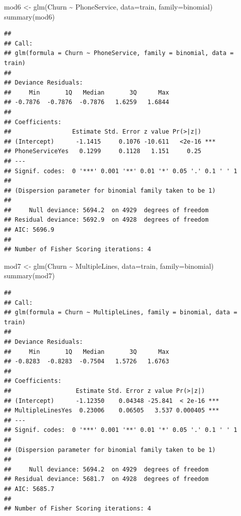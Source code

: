 \documentclass[
  twoside]{article}
\newenvironment{Shaded}{\begin{snugshade}}{\end{snugshade}}
\newcommand{\AttributeTok}[1]{\textcolor[rgb]{0.77,0.63,0.00}{#1}}
\newcommand{\FunctionTok}[1]{\textcolor[rgb]{0.00,0.00,0.00}{#1}}
\newcommand{\NormalTok}[1]{#1}
\newcommand{\OtherTok}[1]{\textcolor[rgb]{0.56,0.35,0.01}{#1}}
\newcommand{\SpecialCharTok}[1]{\textcolor[rgb]{0.00,0.00,0.00}{#1}}
\begin{document}
\begin{Shaded}
\begin{Highlighting}[]
\NormalTok{mod6 }\OtherTok{\textless{}{-}} \FunctionTok{glm}\NormalTok{(Churn }\SpecialCharTok{\textasciitilde{}}\NormalTok{ PhoneService, }\AttributeTok{data=}\NormalTok{train, }\AttributeTok{family=}\NormalTok{binomial)}
\FunctionTok{summary}\NormalTok{(mod6)}
\end{Highlighting}
\end{Shaded}

\begin{verbatim}
## 
## Call:
## glm(formula = Churn ~ PhoneService, family = binomial, data = train)
## 
## Deviance Residuals: 
##     Min       1Q   Median       3Q      Max  
## -0.7876  -0.7876  -0.7876   1.6259   1.6844  
## 
## Coefficients:
##                 Estimate Std. Error z value Pr(>|z|)    
## (Intercept)      -1.1415     0.1076 -10.611   <2e-16 ***
## PhoneServiceYes   0.1299     0.1128   1.151     0.25    
## ---
## Signif. codes:  0 '***' 0.001 '**' 0.01 '*' 0.05 '.' 0.1 ' ' 1
## 
## (Dispersion parameter for binomial family taken to be 1)
## 
##     Null deviance: 5694.2  on 4929  degrees of freedom
## Residual deviance: 5692.9  on 4928  degrees of freedom
## AIC: 5696.9
## 
## Number of Fisher Scoring iterations: 4
\end{verbatim}

\begin{Shaded}
\begin{Highlighting}[]
\NormalTok{mod7 }\OtherTok{\textless{}{-}} \FunctionTok{glm}\NormalTok{(Churn }\SpecialCharTok{\textasciitilde{}}\NormalTok{ MultipleLines, }\AttributeTok{data=}\NormalTok{train, }\AttributeTok{family=}\NormalTok{binomial)}
\FunctionTok{summary}\NormalTok{(mod7)}
\end{Highlighting}
\end{Shaded}

\begin{verbatim}
## 
## Call:
## glm(formula = Churn ~ MultipleLines, family = binomial, data = train)
## 
## Deviance Residuals: 
##     Min       1Q   Median       3Q      Max  
## -0.8283  -0.8283  -0.7504   1.5726   1.6763  
## 
## Coefficients:
##                  Estimate Std. Error z value Pr(>|z|)    
## (Intercept)      -1.12350    0.04348 -25.841  < 2e-16 ***
## MultipleLinesYes  0.23006    0.06505   3.537 0.000405 ***
## ---
## Signif. codes:  0 '***' 0.001 '**' 0.01 '*' 0.05 '.' 0.1 ' ' 1
## 
## (Dispersion parameter for binomial family taken to be 1)
## 
##     Null deviance: 5694.2  on 4929  degrees of freedom
## Residual deviance: 5681.7  on 4928  degrees of freedom
## AIC: 5685.7
## 
## Number of Fisher Scoring iterations: 4
\end{verbatim}
\end{document}
